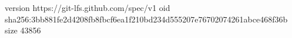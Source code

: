 version https://git-lfs.github.com/spec/v1
oid sha256:3bb881fe2d4208fb8fbcf6ea1f210bd234d555207e76702074261abce468f36b
size 43856
